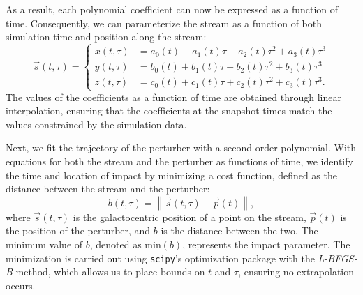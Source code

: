 \documentclass[draft]{aa}
\begin{document}
\begin{appendix}
      As a result, each polynomial coefficient can now be expressed as a function of time. Consequently, we can parameterize the stream as a function of both simulation time and position along the stream:
      \begin{equation}
        \vec{s}(t,\tau) = 
        \left\{
        \begin{aligned}
          x(t,\tau) &= a_0(t) + a_1(t)\tau + a_2(t) \tau^2 + a_3(t)\tau^3 \\ 
          y(t,\tau) &= b_0(t) + b_1(t)\tau + b_2(t) \tau^2 + b_3(t)\tau^3 \\
          z(t,\tau) &= c_0(t) + c_1(t)\tau + c_2(t) \tau^2 + c_3(t)\tau^3.
          \end{aligned}
        \right.
      \end{equation}
      The values of the coefficients as a function of time are obtained through linear interpolation, ensuring that the coefficients at the snapshot times match the values constrained by the simulation data.

      Next, we fit the trajectory of the perturber with a second-order polynomial. With equations for both the stream and the perturber as functions of time, we identify the time and location of impact by minimizing a cost function, defined as the distance between the stream and the perturber:
      \begin{equation} 
        b(t, \tau) = \left\lVert \vec{s}(t, \tau) - \vec{p}(t) \right\rVert, 
        \end{equation}
      where $\vec{s}(t, \tau)$ is the galactocentric position of a point on the stream, $\vec{p}(t)$ is the position of the perturber, and $b$ is the distance between the two. The minimum value of $b$, denoted as $\text{min}(b)$, represents the impact parameter. The minimization is carried out using \texttt{scipy}'s optimization package with the \textit{L-BFGS-B} method, which allows us to place bounds on $t$ and $\tau$, ensuring no extrapolation occurs.


\end{appendix}
\end{document}
